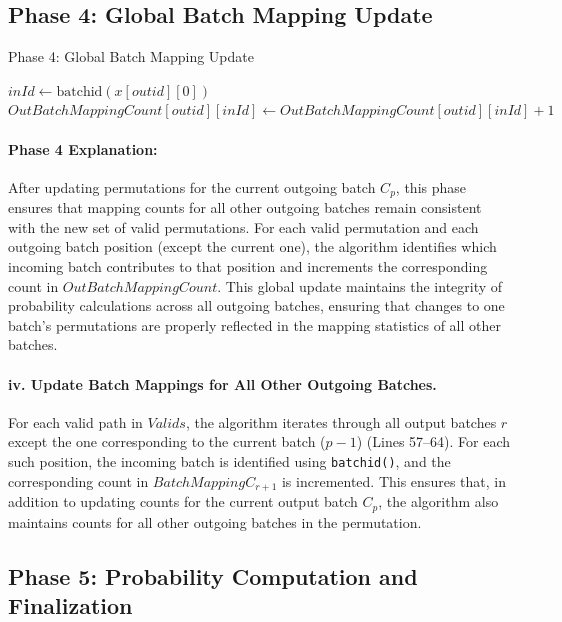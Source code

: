 \documentclass{article}
\begin{document}
\subsection{Phase 4: Global Batch Mapping Update}

\begin{algorithm}[H]
\caption{Phase 4: Global Batch Mapping Update}
\begin{algorithmic}[1]
            \State $ inId \gets \text{batchid}(x[outid][0])$
            \State $ OutBatchMappingCount[outid][inId] \gets OutBatchMappingCount[outid][inId] + 1$
        \EndIf
    \EndFor
\EndFor
\end{algorithmic}
\end{algorithm}

\paragraph{Phase 4 Explanation:}
After updating permutations for the current outgoing batch $C_p$, this phase ensures that mapping counts for all other outgoing batches remain consistent with the new set of valid permutations. For each valid permutation and each outgoing batch position (except the current one), the algorithm identifies which incoming batch contributes to that position and increments the corresponding count in $OutBatchMappingCount$. This global update maintains the integrity of probability calculations across all outgoing batches, ensuring that changes to one batch's permutations are properly reflected in the mapping statistics of all other batches.

\paragraph{iv. Update Batch Mappings for All Other Outgoing Batches.}
For each valid path in $Valids$, the algorithm iterates through all output batches $r$ except the one corresponding to the current batch ($p-1$) (Lines 57–64).  
For each such position, the incoming batch is identified using \texttt{batchid()}, and the corresponding count in $BatchMappingC_{r+1}$ is incremented.  
This ensures that, in addition to updating counts for the current output batch $C_p$, the algorithm also maintains counts for all other outgoing batches in the permutation.

\subsection{Phase 5: Probability Computation and Finalization}
\end{document}
